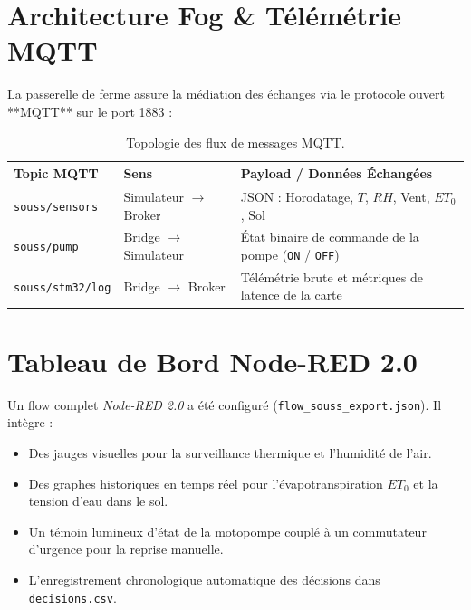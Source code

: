 \documentclass[11pt,a4paper]{report}
\begin{document}
\section{Architecture Fog \& Télémétrie MQTT}
La passerelle de ferme assure la médiation des échanges via le protocole ouvert **MQTT** sur le port 1883 :
\begin{table}[H]
    \centering
    \begin{tabular}{llp{7.5cm}}
        \toprule
        \textbf{Topic MQTT} & \textbf{Sens} & \textbf{Payload / Données Échangées} \\
        \midrule
        \texttt{souss/sensors} & Simulateur $\rightarrow$ Broker & JSON : Horodatage, $T$, $RH$, Vent, $ET_0$, Sol \\
        \texttt{souss/pump} & Bridge $\rightarrow$ Simulateur & État binaire de commande de la pompe (\texttt{ON} / \texttt{OFF}) \\
        \texttt{souss/stm32/log} & Bridge $\rightarrow$ Broker & Télémétrie brute et métriques de latence de la carte \\
        \bottomrule
    \end{tabular}
    \caption{Topologie des flux de messages MQTT.}
\end{table}

\section{Tableau de Bord Node-RED 2.0}
Un flow complet \textit{Node-RED 2.0} a été configuré (\texttt{flow\_souss\_export.json}). Il intègre :
\begin{itemize}
    \item Des jauges visuelles pour la surveillance thermique et l'humidité de l'air.
    \item Des graphes historiques en temps réel pour l'évapotranspiration $ET_0$ et la tension d'eau dans le sol.
    \item Un témoin lumineux d'état de la motopompe couplé à un commutateur d'urgence pour la reprise manuelle.
    \item L'enregistrement chronologique automatique des décisions dans \texttt{decisions.csv}.
\end{itemize}
\end{document}
